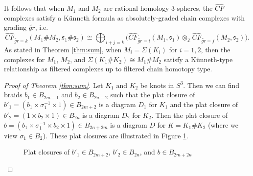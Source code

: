 \documentclass[11pt]{article}
\theoremstyle{plain} \newtheorem{thm}{Theorem}[subsection]
\theoremstyle{plain} \newtheorem{cor}[thm]{Corollary}
\theoremstyle{plain} \newtheorem{prop}[thm]{Proposition}
\theoremstyle{plain} \newtheorem{conj}[thm]{Conjecture}
\theoremstyle{plain} \newtheorem{lem}[thm]{Lemma}
\theoremstyle{definition} \newtheorem{df}[thm]{Definition}
\theoremstyle{remark} \newtheorem{rmk}[thm]{Remark}
\theoremstyle{remark} \newtheorem{obs}[thm]{Observation}
\newcommand{\B}[1]{B_{#1} }
\newcommand{\DBC}[1]{\Sigma(#1)}
\newcommand{\tld}[1]{\widetilde{#1}}
\numberwithin{equation}{section}
\begin{document}
It follows that when $M_{1}$ and $M_{2}$ are rational homology $3$-spheres, the $\widehat{CF}$ complexes satisfy a K\"unneth formula as absolutely-graded chain complexes with grading $\tld{gr}$, i.e.
\begin{equation}\label{eq:grkun}
\widehat{CF}_{\tld{gr} = k}(M_{1} \# M_{2}, \mathfrak{s}_{1} \# \mathfrak{s}_{2})
\cong \displaystyle \bigoplus_{i + j = k}
\bigg( \widehat{CF}_{\tld{gr} = i}(M_{1}, \mathfrak{s}_{1}) \otimes_{\mathbb{Z}} \widehat{CF}_{\tld{gr} = j}(M_{2}, \mathfrak{s}_{2}) \bigg).
\end{equation}
As stated in Theorem \ref{thm:sum}, when $M_{i} = \DBC{K_{i}}$ for $i=1, 2$, then the complexes for $M_{1}$, $M_{2}$, and $\DBC{K_{1} \# K_{2}} \cong M_{1} \# M_{2}$ satisfy a K\"unneth-type relationship as filtered complexes up to filtered chain homotopy type.
\begin{proof}[Proof of Theorem \ref{thm:sum}]
Let $K_{1}$ and $K_{2}$ be knots in $S^{3}$.  Then we can find braids $b_{1} \in \B{2m-1}$ and $b_{2} \in \B{2n-2}$ such that the plat closure of $b'_{1} = \left( b_{1} \times \sigma_{1}^{-1} \times 1\right) \in \B{2m+2}$ is a diagram $D_{1}$ for $K_{1}$ and the plat closure of $b'_{2} = (1\times b_{2} \times 1) \in \B{2n}$ is a diagram $D_{2}$ for $K_{2}$.   Then the plat closure of $b = \left(b_{1} \times \sigma_{1}^{-1} \times b_{2} \times 1 \right)\in \B{2n + 2m}$ is a diagram $D$ for $K = K_{1} \# K_{2}$ (where we view $\sigma_{1} \in \B{2}$).  These plat closures are illustrated in Figure \ref{fig:csplats}.

\begin{figure}[h]
\centering
{}\qquad
{}\qquad
{}
\caption[Plat closures associated to a connected sum]{Plat closures of $b'_{1} \in \B{2m+2}$, $b'_{2} \in \B{2n}$, and $b \in \B{2m + 2n}$}
\label{fig:csplats}
\end{figure}


\end{proof}
\end{document}
